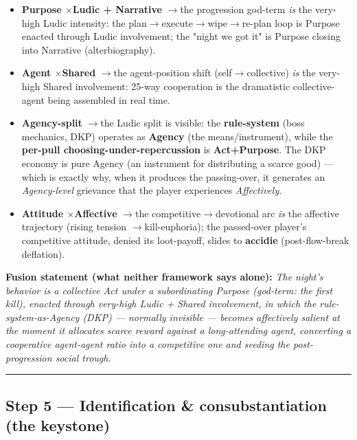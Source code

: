 \documentclass[11pt]{report}
\begin{document}
\begin{itemize}
\item \textbf{Purpose $\times$\allowbreak  Ludic + Narrative} $\rightarrow$\allowbreak  the progression god-term \textit{is} the very-high Ludic intensity: the plan$\rightarrow$\allowbreak execute$\rightarrow$\allowbreak wipe$\rightarrow$\allowbreak re-plan loop is Purpose enacted through Ludic involvement; the "night we got it" is Purpose closing into Narrative (alterbiography).
\item \textbf{Agent $\times$\allowbreak  Shared} $\rightarrow$\allowbreak  the agent-position shift (self$\rightarrow$\allowbreak collective) \textit{is} the very-high Shared involvement: 25-way cooperation is the dramatistic collective-agent being assembled in real time.
\item \textbf{Agency-split} $\rightarrow$\allowbreak  the Ludic split is visible: the \textbf{rule-system} (boss mechanics, DKP) operates as \textbf{Agency} (the means/instrument), while the \textbf{per-pull choosing-under-repercussion} is \textbf{Act+Purpose}. The DKP economy is pure Agency (an instrument for distributing a scarce good) — which is exactly why, when it produces the passing-over, it generates an \textit{Agency-level} grievance that the player experiences \textit{Affectively}.
\item \textbf{Attitude $\times$\allowbreak  Affective} $\rightarrow$\allowbreak  the competitive$\rightarrow$\allowbreak devotional arc \textit{is} the affective trajectory (rising tension $\rightarrow$\allowbreak  kill-euphoria); the passed-over player's competitive attitude, denied its loot-payoff, slides to \textbf{accidie} (post-flow-break deflation).
\end{itemize}


\textbf{Fusion statement (what neither framework says alone):} \textit{The night's behavior is a collective Act under a subordinating Purpose (god-term: the first kill), enacted through very-high Ludic + Shared involvement, in which the rule-system-as-Agency (DKP) — normally invisible — becomes affectively salient at the moment it allocates scarce reward against a long-attending agent, converting a cooperative agent-agent ratio into a competitive one and seeding the post-progression social trough.}


\vspace{0.4em}\hrule\vspace{0.8em}


\subsection{Step 5 — Identification \& consubstantiation (the keystone)}
\end{document}

